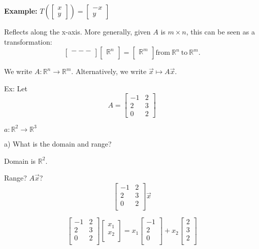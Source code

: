 \documentclass{article}
\begin{document}
\textbf{Example:} \(T\left( \begin{bmatrix} x \\ y \end{bmatrix} \right) = \begin{bmatrix} -x \\ y \end{bmatrix} \)

Reflects along the x-axis. More generally, given \(A\) is \(m \times n\), this can be seen as a transformation:
\[
\begin{bmatrix}
    ---\\
\end{bmatrix}
\begin{bmatrix}
    \mathbb{R}^n \\
\end{bmatrix} = \begin{bmatrix}
    \mathbb{R}^m \\
\end{bmatrix} \text{from} \ \mathbb{R}^n \ \text{to} \ \mathbb{R}^m.
\]

We write \(A: \mathbb{R}^n \rightarrow \mathbb{R}^m\). Alternatively, we write \(\vec{x} \mapsto A\vec{x}\).

Ex: Let 
\[
A = 
\begin{bmatrix}
    -1 & 2 \\
    2 & 3 \\
    0 & 2 
\end{bmatrix}
\]

\(a: \mathbb{R}^2 \rightarrow \mathbb{R}^3\)

a) What is the domain and range?

Domain is \(\mathbb{R}^2\).

Range? \(A\vec{x}\)?
\[
\begin{bmatrix}
    -1 & 2 \\
    2 & 3 \\
    0 & 2 \\
\end{bmatrix}\vec{x}
\]

\[
\begin{bmatrix}
    -1 & 2 \\
    2 & 3 \\
    0 & 2 \\
\end{bmatrix}\begin{bmatrix}
    x_1 \\
    x_2 \\
\end{bmatrix} =
x_1\begin{bmatrix}
    -1 \\
    2 \\
    0 \\
\end{bmatrix} + x_2\begin{bmatrix}
    2 \\
    3 \\
    2 \\
\end{bmatrix}
\]
\end{document}
